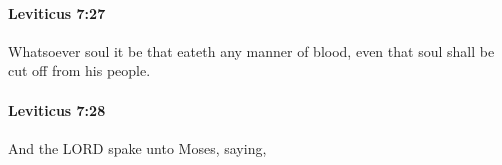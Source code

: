 		\paragraph{Leviticus 7:27} %
			\label{LEVITICUS-7-27}

			Whatsoever soul it be that eateth any manner of blood, even that soul shall be cut off from his people.


		\paragraph{Leviticus 7:28} %
			\label{LEVITICUS-7-28}

			And the LORD spake unto Moses, saying,


